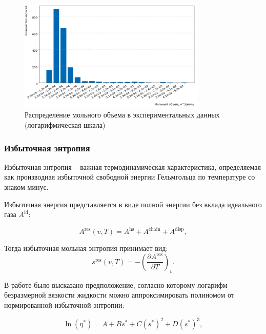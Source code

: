 \documentclass[a4paper,12pt]{article}
\begin{document}
      \begin{figure}[ht!]
          \centering
          \includegraphics[width=0.8\textwidth]{data_distribution_molar_volume.png}
          \caption{Распределение мольного объема в экспериментальных данных (логарифмическая шкала)}
          \label{fig:data_distribution_molar_volume}
      \end{figure}

    \subsubsection{Избыточная энтропия}

      Избыточная энтропия -- важная термодинамическая характеристика, определяемая как производная избыточной свободной энергии Гельмгольца по температуре со знаком минус.

      Избыточная энергия представляется в виде полной энергии без вклада идеального газа $A^{\text{id}}$:
      
      \begin{equation}
      A^{\text{res}}(v, T) = A^{\text{hs}} + A^{\text{chain}} + A^{\text{disp}},
      \end{equation}
      
      Тогда избыточная мольная энтропия принимает вид:
      \begin{equation}
      s^{\text{res}}(v, T) = - \left( \frac{\partial A^{\text{res}}}{\partial T} \right)_v.
      \end{equation}
      
      В работе \cite{roknia2020entropy} было высказано предположение, согласно которому логарифм безразмерной вязкости жидкости можно аппроксимировать полиномом от нормированной избыточной энтропии:
      
      \begin{equation}
      \ln(\eta^*) = A + B s^* + C (s^*)^2 + D (s^*)^3,
      \end{equation}
      
\end{document}
